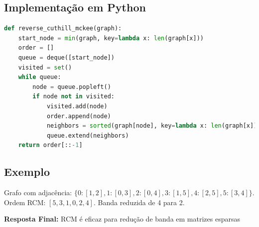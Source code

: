 \subsection*{Implementação em Python}
\begin{lstlisting}[language=Python]
def reverse_cuthill_mckee(graph):
    start_node = min(graph, key=lambda x: len(graph[x]))
    order = []
    queue = deque([start_node])
    visited = set()
    while queue:
        node = queue.popleft()
        if node not in visited:
            visited.add(node)
            order.append(node)
            neighbors = sorted(graph[node], key=lambda x: len(graph[x]))
            queue.extend(neighbors)
    return order[::-1]
\end{lstlisting}

\subsection*{Exemplo}
Grafo com adjacência: \(\{0: [1,2], 1: [0,3], 2: [0,4], 3: [1,5], 4: [2,5], 5: [3,4]\}\).  
Ordem RCM: \([5, 3, 1, 0, 2, 4]\).  
Banda reduzida de 4 para 2.

\textbf{Resposta Final:}  
RCM é eficaz para redução de banda em matrizes esparsas
